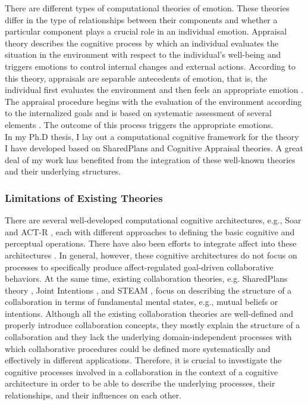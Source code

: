 \documentclass[a4paper, 11pt]{article}
\begin{document}
\begin{small}
There are different types of computational theories of emotion. These theories
differ in the type of relationships between their components and whether a
particular component plays a crucial role in an individual emotion. Appraisal
theory describes the cognitive process by which an individual evaluates the
situation in the environment with respect to the individual's well-being and
triggers emotions to control internal changes and external actions. According to
this theory, appraisals are separable antecedents of emotion, that is, the
individual first evaluates the environment and then feels an appropriate emotion
\cite{scherer:appraisal-processes}. The appraisal procedure begins with the
evaluation of the environment according to the internalized goals and is based
on systematic assessment of several elements
\cite{scherer:sequential-appraisal-process}. The outcome of this process
triggers the appropriate emotions.\\

In my Ph.D thesis, I lay out a computational cognitive framework for the theory
I have developed based on SharedPlans and Cognitive Appraisal theories. A great
deal of my work has benefited from the integration of these well-known
theories and their underlying structures.

\subsubsection*{Limitations of Existing Theories}

There are several well-developed computational cognitive architectures, e.g.,
Soar \cite{laird:soar} and ACT-R \cite{anderson:act-r}, each with different
approaches to defining the basic cognitive and perceptual operations. There have
also been efforts to integrate affect into these architectures
\cite{marinier:behavior-emotion}. In general, however, these cognitive
architectures do not focus on processes to specifically produce affect-regulated
goal-driven collaborative behaviors. At the same time, existing collaboration
theories, e.g. SharedPlans theory \cite{grosz:plans-discourse}, Joint Intentions
\cite{cohen:teamwork}, and STEAM \cite{tambe:flexible-teamwork}, focus on
describing the structure of a collaboration in terms of fundamental mental
states, e.g., mutual beliefs or intentions. Although all the existing
collaboration theories are well-defined and properly introduce collaboration
concepts, they mostly explain the structure of a collaboration and they lack the
underlying domain-independent processes with which collaborative procedures
could be defined more systematically and effectively in different applications.
Therefore, it is crucial to investigate the cognitive processes involved in a
collaboration in the context of a cognitive architecture in order to be able to
describe the underlying processes, their relationships, and their influences on
each other.


\end{small}
\end{document}
